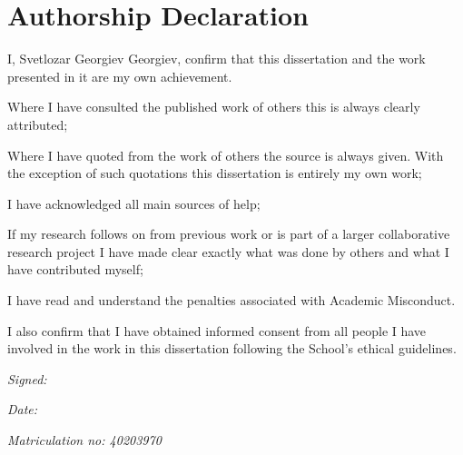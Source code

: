 
\section*{Authorship Declaration}
\vspace{0.5cm}
\begin{flushleft}
I, Svetlozar Georgiev Georgiev, confirm that this dissertation and the work presented in it are my own achievement.\newline

Where I have consulted the published work of others this is always clearly attributed;\newline

Where I have quoted from the work of others the source is always given. With the exception of such quotations this dissertation is entirely my own work;\newline

I have acknowledged all main sources of help; \newline

If my research follows on from previous work or is part of a larger collaborative research project I have made clear exactly what was done by others and what I have contributed myself;\newline

I have read and understand the penalties associated with Academic Misconduct.\newline

I also confirm that I have obtained informed consent from all people I have involved in the work in this dissertation following the School's ethical guidelines.\newline
\end{flushleft}

\begin{flushleft} \large
\emph{Signed:} \\
\end{flushleft}

\vspace{.5cm}

\begin{flushleft} \large
\emph{Date:} \\
\end{flushleft}

\vspace{.5cm}

\begin{flushleft} \large
\emph{Matriculation no: 40203970}  \\
\end{flushleft}